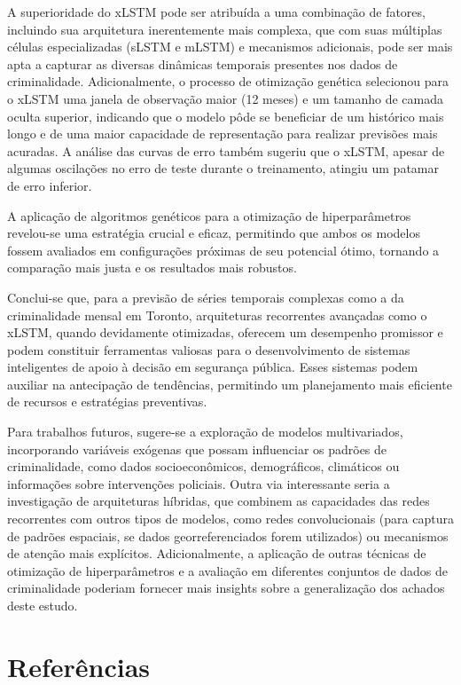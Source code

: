 \documentclass[conference]{IEEEtran}
\begin{document}
A superioridade do xLSTM pode ser atribuída a uma combinação de fatores, incluindo sua arquitetura inerentemente mais complexa, que com suas múltiplas células especializadas (sLSTM e mLSTM) e mecanismos adicionais, pode ser mais apta a capturar as diversas dinâmicas temporais presentes nos dados de criminalidade. Adicionalmente, o processo de otimização genética selecionou para o xLSTM uma janela de observação maior (12 meses) e um tamanho de camada oculta superior, indicando que o modelo pôde se beneficiar de um histórico mais longo e de uma maior capacidade de representação para realizar previsões mais acuradas. A análise das curvas de erro também sugeriu que o xLSTM, apesar de algumas oscilações no erro de teste durante o treinamento, atingiu um patamar de erro inferior.

A aplicação de algoritmos genéticos para a otimização de hiperparâmetros revelou-se uma estratégia crucial e eficaz, permitindo que ambos os modelos fossem avaliados em configurações próximas de seu potencial ótimo, tornando a comparação mais justa e os resultados mais robustos.

Conclui-se que, para a previsão de séries temporais complexas como a da criminalidade mensal em Toronto, arquiteturas recorrentes avançadas como o xLSTM, quando devidamente otimizadas, oferecem um desempenho promissor e podem constituir ferramentas valiosas para o desenvolvimento de sistemas inteligentes de apoio à decisão em segurança pública. Esses sistemas podem auxiliar na antecipação de tendências, permitindo um planejamento mais eficiente de recursos e estratégias preventivas.

Para trabalhos futuros, sugere-se a exploração de modelos multivariados, incorporando variáveis exógenas que possam influenciar os padrões de criminalidade, como dados socioeconômicos, demográficos, climáticos ou informações sobre intervenções policiais. Outra via interessante seria a investigação de arquiteturas híbridas, que combinem as capacidades das redes recorrentes com outros tipos de modelos, como redes convolucionais (para captura de padrões espaciais, se dados georreferenciados forem utilizados) ou mecanismos de atenção mais explícitos. Adicionalmente, a aplicação de outras técnicas de otimização de hiperparâmetros e a avaliação em diferentes conjuntos de dados de criminalidade poderiam fornecer mais insights sobre a generalização dos achados deste estudo.

\section*{Referências}
\end{document}
